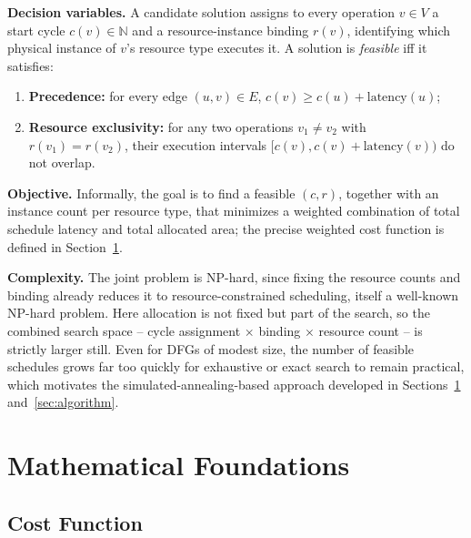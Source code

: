 \documentclass[conference]{IEEEtran}
\begin{document}
    \textbf{Decision variables.} A candidate solution assigns to every operation $v \in V$ a start
    cycle $c(v) \in \mathbb{N}$ and a resource-instance binding $r(v)$, identifying which physical
    instance of $v$'s resource type executes it. A solution is \emph{feasible} iff it satisfies:
    \begin{enumerate}
        \item \textbf{Precedence:} for every edge $(u, v) \in E$,
        $c(v) \geq c(u) + \mathrm{latency}(u)$;
        \item \textbf{Resource exclusivity:} for any two operations $v_1 \neq v_2$ with
        $r(v_1) = r(v_2)$, their execution intervals
        $[c(v), c(v) + \mathrm{latency}(v))$ do not overlap.
    \end{enumerate}

    \textbf{Objective.} Informally, the goal is to find a feasible $(c, r)$, together with an
    instance count per resource type, that minimizes a weighted combination of total schedule
    latency and total allocated area; the precise weighted cost function is defined in
    Section~\ref{sec:math-basics}.

    \textbf{Complexity.} The joint problem is NP-hard, since fixing the resource counts and binding
    already reduces it to resource-constrained scheduling, itself a well-known NP-hard problem. Here
    allocation is not fixed but part of the search, so the combined search space -- cycle
    assignment $\times$ binding $\times$ resource count -- is strictly larger still. Even for DFGs of
    modest size, the number of feasible schedules grows far too quickly for exhaustive or exact
    search to remain practical, which motivates the simulated-annealing-based approach developed in
    Sections~\ref{sec:math-basics} and~\ref{sec:algorithm}.

    \section{Mathematical Foundations}
    \label{sec:math-basics}

    \subsection{Cost Function}
    \label{sec:cost-function}
\end{document}
